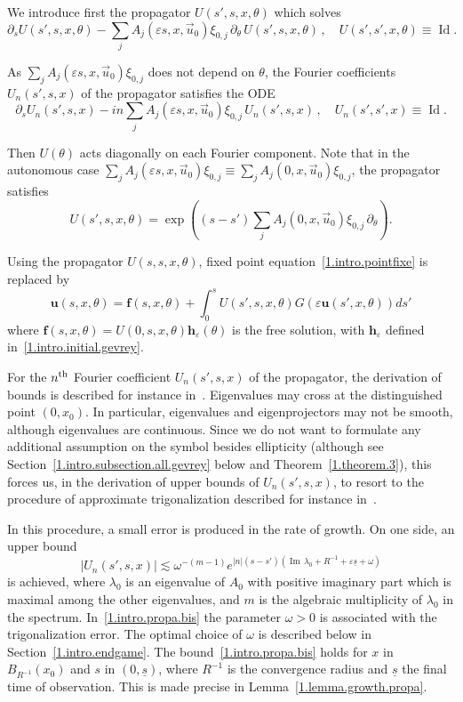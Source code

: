 \documentclass[AHL,Unicode,longabstracts,published]{cedram}
\theoremstyle{plain}
\newcommand*\e{\varepsilon}
\newcommand{\dptl}{\partial}%
\newcommand{\ubf}{{\mathbf u}}
\newcommand*\f{{\mathbf f}}
\newcommand*\h{{\mathbf h}}
\newcommand*\und{\underline}
\DeclareMathOperator{\Id}{Id}
\DeclareMathOperator{\Imm}{Im}
\begin{document}
We introduce first the propagator $U(s',s,x,\theta)$ which solves
\[
\dptl_{s} U(s',s,x,\theta) - \sum_j A_j(\e s, x, \vec{u}_0)\xi_{0,j} \,\dptl_{\theta} \, U(s',s,x,\theta)\,, \quad U(s',s',x,\theta) \equiv {\Id}.
\]


As $\sum_j A_j(\e s, x, \vec{u}_0)\xi_{0,j}$ does not depend on $\theta$, the Fourier coefficients $U_n(s',s,x)$ of the propagator satisfies the ODE
\[
\dptl_{s} U_n(s',s,x) - in\sum_j A_j(\e s, x, \vec{u}_0)\xi_{0,j} \,U_n(s',s,x) \,, \quad U_n(s',s',x) \equiv {\Id}.
\]


Then $U(\theta)$ acts diagonally on each Fourier component. Note that in the autonomous case $\sum_j A_j(\e s, x, \vec{u}_0)\xi_{0,j} \equiv \sum_j A_j(0, x, \vec{u}_0)\xi_{0,j}$, the propagator satisfies
\[
U(s',s,x,\theta) = \exp \left((s-s') \sum_j A_j(0, x, \vec{u}_0)\xi_{0,j} \, \dptl_{\theta} \right).
\]


Using the propagator $U(s,s,x,\theta)$, fixed point equation~\eqref{1.intro.pointfixe} is replaced by
\begin{equation}\label{1.intro.pointfixe.full}
\ubf(s,x,\theta) = \f(s,x,\theta) + \int_{0}^{s} U(s',s,x,\theta) G(\e\ubf(s',x,\theta)) ds'
\end{equation}
where $\f(s,x,\theta) = U(0,s,x,\theta) \h_{\e}(\theta)$ is the free solution, with $\h_{\e}$ defined in~\eqref{1.intro.initial.gevrey}.

For the $n^{\rm th}$ Fourier coefficient $U_n(s',s,x)$ of the propagator, the derivation of bounds is described for instance in~\cite[Section~4]{lerner2015onset}. Eigenvalues may cross at the distinguished point $(0,x_0)$. In particular, eigenvalues and eigenprojectors may not be smooth, although eigenvalues are continuous. Since we do not want to formulate any additional assumption on the symbol besides ellipticity (although see Section~\ref{1.intro.subsection.all.gevrey} below and Theorem~\ref{1.theorem.3}), this forces us, in the derivation of upper bounds of $U_n(s',s,x)$, to resort to the procedure of approximate trigonalization described for instance in~\cite{lerner2015onset}.

In this procedure, a small error is produced in the rate of growth. On one side, an upper bound
\begin{equation}
\label{1.intro.propa.bis}
\left|U_n(s',s,x)\right| \lesssim \omega^{-(m-1)} e^{|n|(s-s') ({\Imm}\,\lambda_0 + R^{-1} + \e \und{s} + \omega)}
\end{equation}
is achieved, where $\lambda_0$ is an eigenvalue of $A_0$ with positive imaginary part which is maximal among the other eigenvalues, and $m$ is the algebraic multiplicity of $\lambda_0$ in the spectrum. In~\eqref{1.intro.propa.bis} the parameter $\omega>0$ is associated with the trigonalization error. The optimal choice of $\omega$ is described below in Section~\ref{1.intro.endgame}. The bound~\eqref{1.intro.propa.bis} holds for $x$ in $B_{R^{-1}}(x_0)$ and $s$ in $(0,\und{s})$, where $R^{-1}$ is the convergence radius and $\und{s}$ the final time of observation. This is made precise in Lemma~\ref{1.lemma.growth.propa}.
\end{document}
